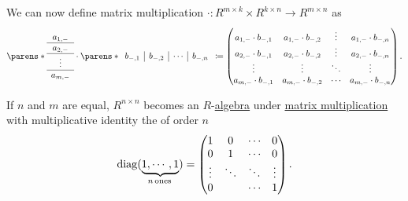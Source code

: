 \begin{proposition}
\begin{thmenum}
    We can now define matrix multiplication \( \cdot: R^{m \times k} \times R^{k \times n} \to R^{m \times n} \) as
    \begin{equation*}
     \parens*
       {
         \begin{array}{c}
            a_{1,-} \\
            \hline
            a_{2,-} \\
            \hline
            \vdots \\
            \hline
            a_{m,-}
          \end{array}
        }
      \cdot
      \parens*
        {
          \begin{array}{c|c|c|c}
            b_{-,1} & b_{-,2} & \cdots & b_{-,n}
          \end{array}
        }
      \coloneqq
      \begin{pmatrix}
        a_{1,-} \cdot b_{-,1} & a_{1,-} \cdot b_{-,2} & \vdots & a_{1,-} \cdot b_{-,n} \\
        a_{2,-} \cdot b_{-,1} & a_{2,-} \cdot b_{-,2} & \vdots & a_{2,-} \cdot b_{-,n} \\
        \vdots                & \vdots                & \ddots & \vdots                \\
        a_{m,-} \cdot b_{-,1} & a_{m,-} \cdot b_{-,2} & \cdots & a_{m,-} \cdot b_{-,n}
      \end{pmatrix}.
    \end{equation*}

    If \( n \) and \( m \) are equal, \( R^{n \times n} \) becomes an \( R \)-\hyperref[def:algebra_over_semiring]{algebra} under \hyperref[thm:matrix_algebra/matrix_multiplication]{matrix multiplication} with multiplicative identity the  of order \( n \)
    \begin{equation}\label{eq:thm:matrix_algebra/matrix_multiplication/identity}
      \op{diag}(\underbrace{ 1, \cdots, 1 }_{n \T*{ones}})
      =
      \begin{pmatrix}
        1       & 0      & \cdots & 0      \\
        0       & 1      & \cdots & 0      \\
        \vdots  & \ddots & \ddots & \vdots \\
        0       &        & \cdots & 1
      \end{pmatrix}.
    \end{equation}
  \end{thmenum}
\end{proposition}
